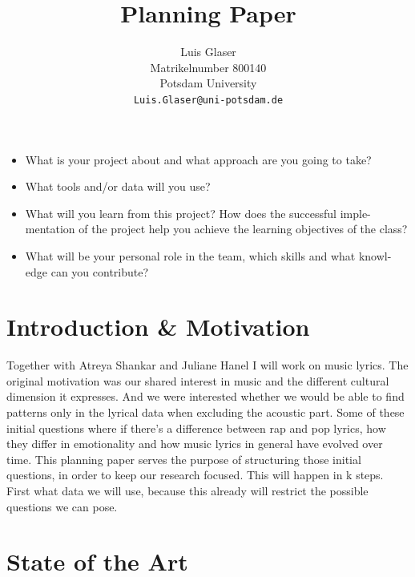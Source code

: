 \documentclass[11pt,a4paper]{article}
\title{Planning Paper}
\author{Luis Glaser\\
  Matrikelnumber 800140 \\
  Potsdam University \\
  {\tt Luis.Glaser@uni-potsdam.de}
  \\}
\date{}
\begin{document}
\maketitle
\begin{itemize}
\item What is your project about and what approach are you going to take?
\item What tools and/or data will you use?
\item What will you learn from this project? How does the successful imple- mentation of the project help you achieve the learning objectives of the class?
\item What will be your personal role in the team, which skills and what knowl- edge can you contribute?
\end{itemize}


\section{Introduction \& Motivation}

Together with Atreya Shankar and Juliane Hanel I will work on music lyrics. The original motivation was our shared interest in music and the different cultural dimension it expresses. And we were interested whether we would be able to find patterns only in the lyrical data when excluding the acoustic part. Some of these initial questions where if there's a difference between rap and pop lyrics, how they differ in emotionality and how music lyrics in general have evolved over time.
This planning paper serves the purpose of structuring those initial questions, in order to keep our research focused. This will happen in k%
 steps. First what data we will use, because this already will restrict the possible questions we can pose. 

\section{State of the Art}
\end{document}
